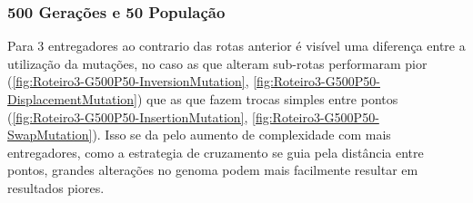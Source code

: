 \begin{center}
	\label{fig:Roteiro3-Mapa3}
\end{center}


\subsubsection{500 Gerações e 50 População}

Para 3 entregadores ao contrario das rotas anterior é visível uma diferença entre a utilização da mutações, no caso as que alteram sub-rotas performaram pior (\ref{fig:Roteiro3-G500P50-InversionMutation}, \ref{fig:Roteiro3-G500P50-DisplacementMutation}) que as que fazem trocas simples entre pontos (\ref{fig:Roteiro3-G500P50-InsertionMutation}, \ref{fig:Roteiro3-G500P50-SwapMutation}). Isso se da pelo aumento de complexidade com mais entregadores, como a estrategia de cruzamento se guia pela distância entre pontos, grandes alterações no genoma podem mais facilmente resultar em resultados piores.

